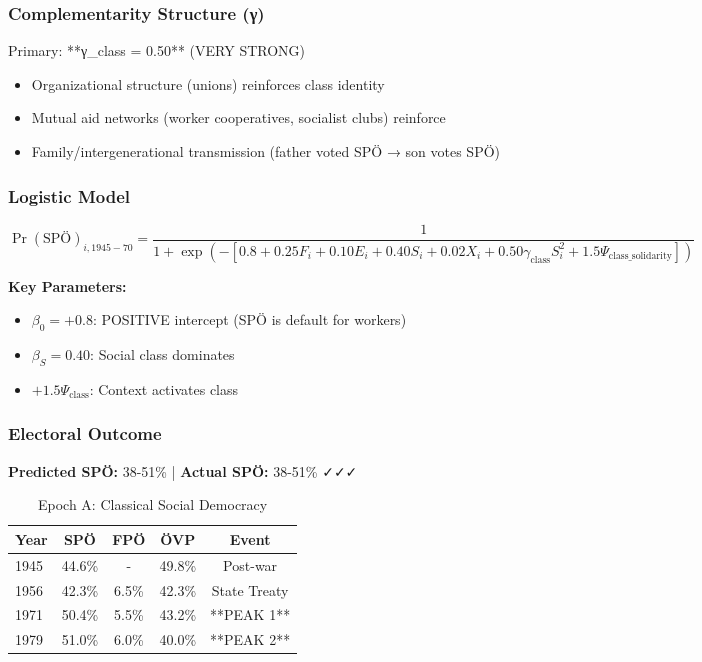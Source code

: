 \subsubsection{Complementarity Structure (γ)}

Primary: **γ_class = 0.50** (VERY STRONG)

\begin{itemize}[nosep]
\item Organizational structure (unions) reinforces class identity
\item Mutual aid networks (worker cooperatives, socialist clubs) reinforce
\item Family/intergenerational transmission (father voted SPÖ → son votes SPÖ)
\end{itemize}

\subsubsection{Logistic Model}

$$\Pr(\text{SPÖ})_{i,1945-70} = \frac{1}{1 + \exp(-[0.8 + 0.25 F_i + 0.10 E_i + 0.40 S_i + 0.02 X_i + 0.50 \gamma_{\text{class}} S_i^2 + 1.5 \Psi_{\text{class\_solidarity}}])}$$

\textbf{Key Parameters:}
\begin{itemize}[nosep]
\item $\beta_0 = +0.8$: POSITIVE intercept (SPÖ is default for workers)
\item $\beta_S = 0.40$: Social class dominates
\item $+1.5 \Psi_{\text{class}}$: Context activates class
\end{itemize}

\subsubsection{Electoral Outcome}

\textbf{Predicted SPÖ:} 38-51\% | \textbf{Actual SPÖ:} 38-51\% ✓✓✓

\begin{table}[h]
\centering
\caption{Epoch A: Classical Social Democracy}
\label{tab:epocha-spo}
\begin{tabular}{lcccc}
\toprule
Year & SPÖ & FPÖ & ÖVP & Event \\
\midrule
1945 & 44.6\% & - & 49.8\% & Post-war \\
1956 & 42.3\% & 6.5\% & 42.3\% & State Treaty \\
1971 & 50.4\% & 5.5\% & 43.2\% & **PEAK 1** \\
1979 & 51.0\% & 6.0\% & 40.0\% & **PEAK 2** \\
\bottomrule
\end{tabular}
\end{table}

